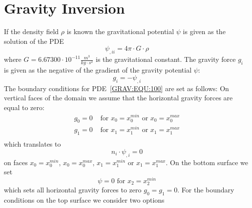 
%
%
%

\section{Gravity Inversion}\label{sec:forward gravity}


If the density field $\rho$ is known the gravitational potential $\psi$ is given
as the solution of the PDE 
\begin{equation}\label{GRAV:EQU:100}
\psi_{,ii} = 4\pi \cdot G \cdot  \rho
\end{equation}
where $G=6.67300 \cdot 10^{-11}  \frac{m^3}{kg \cdot s^2}$ is the gravitational constant.  
The gravity force $g_i$ is given
as the negative of the gradient of the gravity potential $\psi$:
\begin{equation}\label{GRAV:EQU:101}
 g_i = - \psi_{,i} 
\end{equation} 
The boundary conditions for PDE~\ref{GRAV:EQU:100} are set as follows:
On vertical faces of the domain we assume that the horizontal gravity forces are equal to zero:
\begin{equation}\label{GRAV:EQU:101a}
\begin{array}{ll}
g_0=0 & \mbox{ for } x_0=x^{min}_0 \mbox{ or } x_0=x^{max}_0 \\
g_1=0 & \mbox{ for } x_1=x^{min}_1 \mbox{ or } x_1=x^{max}_1 \\
\end{array}
\end{equation}
which translates to
\begin{equation}\label{GRAV:EQU:101aa}
n_i \cdot  \psi_{,i} = 0
\end{equation} 
on faces $x_0=x^{min}_0$, 
$x_0=x^{max}_0$,
$x_1=x^{min}_1$ or 
$x_1=x^{max}_1$. On the bottom surface we set 
\begin{equation}\label{GRAV:EQU:101b}
\psi = 0 \mbox{ for } x_2=x^{min}_2
\end{equation} 
which sets all horizontal gravity forces to zero $g_0=g_1=0$. 
For the boundary conditions on the top surface we consider two options
